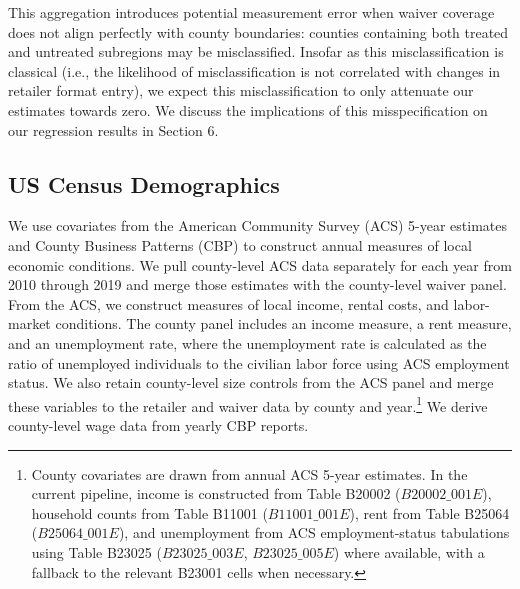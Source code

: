 \documentclass[12pt]{article}
\begin{document}

This aggregation introduces potential measurement error when waiver coverage does not align perfectly with county boundaries: counties containing both treated and untreated subregions may be misclassified. Insofar as this misclassification is classical (i.e., the likelihood of misclassification is not correlated with changes in retailer format entry), we expect this misclassification to only attenuate our estimates towards zero. We discuss the implications of this misspecification on our regression results in Section 6.


\subsection{US Census Demographics}

We use covariates from the American Community Survey (ACS) 5-year estimates and County Business Patterns (CBP) to construct annual measures of local economic conditions. We pull county-level ACS data separately for each year from 2010 through 2019 and merge those estimates with the county-level waiver panel. From the ACS, we construct measures of local income, rental costs, and labor-market conditions. The county panel includes an income measure, a rent measure, and an unemployment rate, where the unemployment rate is calculated as the ratio of unemployed individuals to the civilian labor force using ACS employment status. We also retain county-level size controls from the ACS panel and merge these variables to the retailer and waiver data by county and year.\footnote{County covariates are drawn from annual ACS 5-year estimates. In the current pipeline, income is constructed from Table B20002 ($B20002\_001E$), household counts from Table B11001 ($B11001\_001E$), rent from Table B25064 ($B25064\_001E$), and unemployment from ACS employment-status tabulations using Table B23025 ($B23025\_003E$, $B23025\_005E$) where available, with a fallback to the relevant B23001 cells when necessary.
} We derive county-level wage data from yearly CBP reports.
\end{document}
